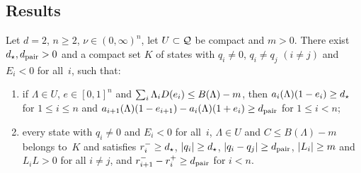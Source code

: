 \subsection{Results}

\begin{theorem}\label{thm:barrier}
Let $d=2$, $n\geq2$, $\nu\in(0,\infty)^n$, let $U\subset\mathcal{Q}$ be compact and $m>0$. There exist $d_\star,d_{\mathrm{pair}}>0$ and a compact set $K$ of states with $q_i\neq0$, $q_i\neq q_j$ $(i\neq j)$ and $E_i<0$ for all~$i$, such that:
\begin{enumerate}[label=(\roman*)]
\item if $\Lambda\in U$, $e\in[0,1]^n$ and $\sum_i\Lambda_iD(e_i)\leq B(\Lambda)-m$, then $a_i(\Lambda)(1-e_i)\geq d_\star$ for $1\leq i\leq n$ and $a_{i+1}(\Lambda)(1-e_{i+1})-a_i(\Lambda)(1+e_i)\geq d_{\mathrm{pair}}$ for $1\leq i<n$;
\item every state with $q_i\neq0$ and $E_i<0$ for all~$i$, $\Lambda\in U$ and $C\leq B(\Lambda)-m$ belongs to~$K$ and satisfies $r_i^-\geq d_\star$, $\lvert q_i\rvert\geq d_\star$, $\lvert q_i-q_j\rvert\geq d_{\mathrm{pair}}$, $\lvert L_i\rvert\geq m$ and $L_iL>0$ for all $i\neq j$, and $r_{i+1}^--r_i^+\geq d_{\mathrm{pair}}$ for $i<n$.
\end{enumerate}
\end{theorem}

